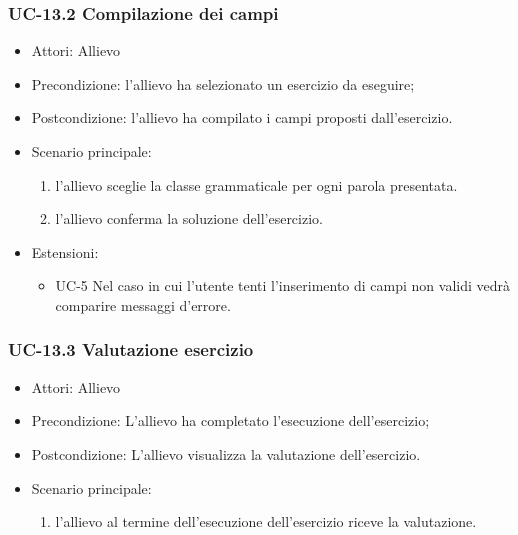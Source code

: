 	\subsubsection{UC-13.2 Compilazione dei campi}
		\begin{itemize}
			\item Attori: Allievo
			\item Precondizione: l'allievo ha selezionato un esercizio da eseguire;
			\item Postcondizione: l'allievo ha compilato i campi proposti dall'esercizio.
			\item Scenario principale:
				\begin{enumerate}
					\item l'allievo sceglie la classe grammaticale per ogni parola presentata.
					\item l'allievo conferma la soluzione dell'esercizio.
				\end{enumerate}
			\item Estensioni: 
				\begin{itemize}
					\item UC-5 Nel caso in cui l'utente tenti l'inserimento di campi non validi vedrà comparire messaggi d'errore.
				\end{itemize}
		\end{itemize}

	\subsubsection{UC-13.3 Valutazione esercizio}
	\begin{itemize}
			\item Attori: Allievo
			\item Precondizione: L'allievo ha completato l'esecuzione dell'esercizio;
			\item Postcondizione: L'allievo visualizza la valutazione dell'esercizio.
			\item Scenario principale:
				\begin{enumerate}
					\item l'allievo al termine dell'esecuzione dell'esercizio riceve la valutazione.
				\end{enumerate}
			\end{itemize}
			
